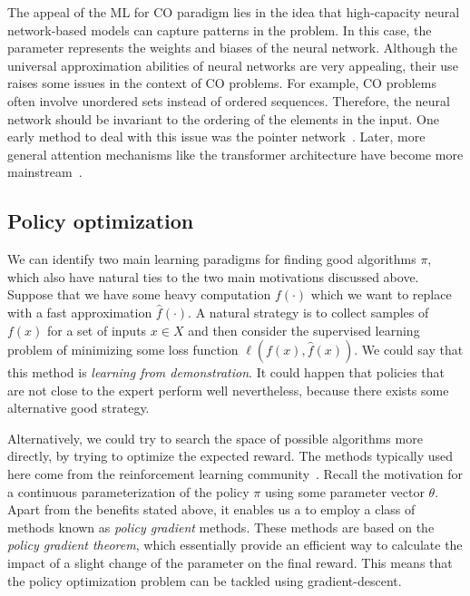 \documentclass[a4paper]{report}
\theoremstyle{definition}
\theoremstyle{plain}
\newcommand\note[1]{{\color{Navy}\noindent#1}}
\begin{document}
The appeal of the ML for CO paradigm lies in the idea that high-capacity neural
network-based models can capture patterns in the problem.
%
In this case, the parameter represents the weights and biases of the neural
network.
Although the universal approximation abilities of neural networks are very
appealing, their use raises some issues in the context of CO problems. For
example, CO problems often involve unordered sets instead of ordered sequences.
Therefore, the neural network should be invariant to the ordering of the
elements in the input. One early method to deal with this issue was the pointer
network~\cite{vinyalsPointerNetworks2017a}.
Later, more general attention mechanisms like the transformer architecture have
become more mainstream~\cite{koolAttentionLearnSolve2019}.

\subsection{Policy optimization}

We can identify two main learning paradigms for finding good algorithms $\pi$,
which also have natural ties to the two main motivations discussed above.
%
Suppose that we have some heavy computation $f(\cdot)$ which we want to replace
with a fast approximation $\hat{f}(\cdot)$.
%
A natural strategy is to collect samples of $f(x)$ for a set of inputs $x \in X$
and then consider the supervised learning problem of minimizing some loss
function $\ell(f(x), \hat{f}(x))$.
%
We could say that this method is \emph{learning from demonstration}.
%
\note{It could happen that policies that are not close to the expert perform
  well nevertheless, because there exists some alternative good strategy.}

Alternatively, we could try to search the space of possible algorithms more
directly, by trying to optimize the expected reward.
%
The methods typically used here come from the reinforcement learning
community~\cite{mazyavkinaReinforcementLearningCombinatorial2020}.
%
Recall the motivation for a continuous parameterization of the policy $\pi$
using some parameter vector $\theta$.
%
Apart from the benefits stated above, it enables us a to employ a class of
methods known as \emph{policy gradient} methods.
%
These methods are based on the \emph{policy gradient theorem}, which essentially
provide an efficient way to calculate the impact of a slight change of the
parameter on the final reward.
%
This means that the policy optimization problem can be tackled using
gradient-descent.
\end{document}
